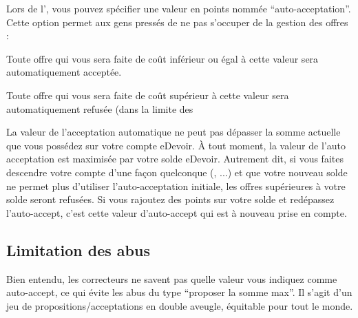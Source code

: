 Lors de l', vous pouvez spécifier une valeur en points nommée “auto-acceptation”. Cette option permet aux gens pressés de ne pas s'occuper de la gestion des offres :
\item Toute offre qui vous sera faite de coût inférieur ou égal à cette valeur sera automatiquement acceptée.
\item Toute offre qui vous sera faite de coût supérieur à cette valeur sera automatiquement refusée (dans la limite des %

La valeur de l'acceptation automatique ne peut pas dépasser la somme actuelle que vous possédez sur votre compte eDevoir.
À tout moment, la valeur de l'auto acceptation est maximisée par votre solde eDevoir.
Autrement dit, si vous faites descendre votre compte d'une façon quelconque (, ...) et que votre nouveau solde ne permet plus d'utiliser l'auto-acceptation initiale, les offres supérieures à votre solde seront refusées.
Si vous rajoutez des points sur votre solde et redépassez l'auto-accept, c'est cette valeur d'auto-accept qui est à nouveau prise en compte.

\subsection{Limitation des abus}
Bien entendu, les correcteurs ne savent pas quelle valeur vous indiquez comme auto-accept, ce qui évite les abus du type “proposer la somme max”. Il s'agit d'un jeu de propositions/acceptations en double aveugle, équitable pour tout le monde.